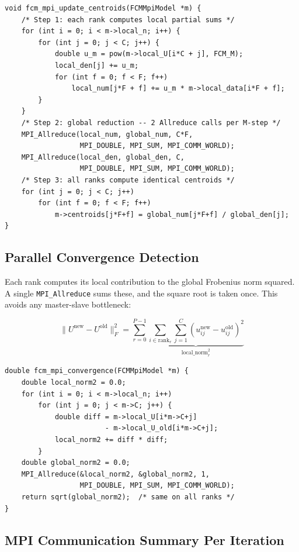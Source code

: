 \documentclass[12pt,a4paper]{article}
\begin{document}
\begin{lstlisting}[style=cstyle, caption={Parallel M-step — local partial sums aggregated via MPI\_Allreduce}]
void fcm_mpi_update_centroids(FCMMpiModel *m) {
    /* Step 1: each rank computes local partial sums */
    for (int i = 0; i < m->local_n; i++) {
        for (int j = 0; j < C; j++) {
            double u_m = pow(m->local_U[i*C + j], FCM_M);
            local_den[j] += u_m;
            for (int f = 0; f < F; f++)
                local_num[j*F + f] += u_m * m->local_data[i*F + f];
        }
    }
    /* Step 2: global reduction -- 2 Allreduce calls per M-step */
    MPI_Allreduce(local_num, global_num, C*F,
                  MPI_DOUBLE, MPI_SUM, MPI_COMM_WORLD);
    MPI_Allreduce(local_den, global_den, C,
                  MPI_DOUBLE, MPI_SUM, MPI_COMM_WORLD);
    /* Step 3: all ranks compute identical centroids */
    for (int j = 0; j < C; j++)
        for (int f = 0; f < F; f++)
            m->centroids[j*F+f] = global_num[j*F+f] / global_den[j];
}
\end{lstlisting}

\subsection{Parallel Convergence Detection}

Each rank computes its local contribution to the global Frobenius norm squared. A single \texttt{MPI\_Allreduce} sums these, and the square root is taken once. This avoids any master-slave bottleneck:

\[
\|U^{\text{new}} - U^{\text{old}}\|_F^2 = \sum_{r=0}^{P-1} \underbrace{\sum_{i \in \text{rank}_r} \sum_{j=1}^{C} (u_{ij}^{\text{new}} - u_{ij}^{\text{old}})^2}_{\text{local\_norm}^2_r}
\]

\begin{lstlisting}[style=cstyle, caption={Distributed convergence detection — no master bottleneck}]
double fcm_mpi_convergence(FCMMpiModel *m) {
    double local_norm2 = 0.0;
    for (int i = 0; i < m->local_n; i++)
        for (int j = 0; j < m->C; j++) {
            double diff = m->local_U[i*m->C+j]
                        - m->local_U_old[i*m->C+j];
            local_norm2 += diff * diff;
        }
    double global_norm2 = 0.0;
    MPI_Allreduce(&local_norm2, &global_norm2, 1,
                  MPI_DOUBLE, MPI_SUM, MPI_COMM_WORLD);
    return sqrt(global_norm2);  /* same on all ranks */
}
\end{lstlisting}

\subsection{MPI Communication Summary Per Iteration}
\end{document}
